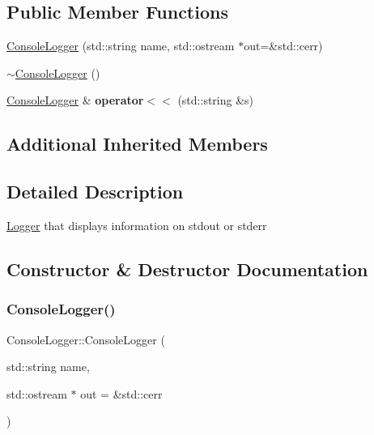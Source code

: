 \subsection*{Public Member Functions}
\begin{DoxyCompactItemize}
\item 
\hyperlink{classez_1_1logging_1_1ConsoleLogger_a6b9357ce75b0207d0cb68866584b0080}{Console\+Logger} (std\+::string name, std\+::ostream $\ast$out=\&std\+::cerr)
\item 
\hyperlink{classez_1_1logging_1_1ConsoleLogger_a242e88aa9495249d5a7fbdfc4f8886ee}{$\sim$\+Console\+Logger} ()
\item 
\mbox{\label{classez_1_1logging_1_1ConsoleLogger_a66ac6d21ed4ee2657b79429b78bd16d2}} 
\hyperlink{classez_1_1logging_1_1ConsoleLogger}{Console\+Logger} \& {\bfseries operator$<$$<$} (std\+::string \&s)
\end{DoxyCompactItemize}
\subsection*{Additional Inherited Members}


\subsection{Detailed Description}
\hyperlink{classez_1_1logging_1_1Logger}{Logger} that displays information on stdout or stderr 

\subsection{Constructor \& Destructor Documentation}
\mbox{\label{classez_1_1logging_1_1ConsoleLogger_a6b9357ce75b0207d0cb68866584b0080}} 
\subsubsection{\texorpdfstring{Console\+Logger()}{ConsoleLogger()}}
{\footnotesize\ttfamily Console\+Logger\+::\+Console\+Logger (\begin{DoxyParamCaption}\item[{std\+::string}]{name,  }\item[{std\+::ostream $\ast$}]{out = {\ttfamily \&std\+:\+:cerr} }\end{DoxyParamCaption})}

